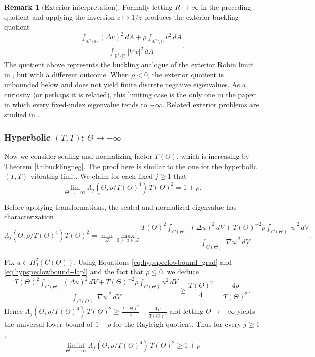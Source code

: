 \documentclass[11pt]{amsart}
\theoremstyle{definition}
\newtheorem{remark}[theorem]{Remark}
\numberwithin{equation}{section}
\newcommand{\lapl}{\Delta}
\newcommand{\grad}{\nabla}
\newcommand{\R}{\mathbb{R}}
\newcommand{\D}{\mathbb{D}}
\begin{document}
\begin{remark}[Exterior interpretation]\label{rem:exterior-buckling}
Formally letting $R\to\infty$ in the preceding quotient and applying the inversion $z\mapsto1/z$ produces the exterior buckling quotient
\[
\dfrac{\displaystyle \int_{\R^2\setminus\D}(\lapl v)^2\,dA
+\rho\int_{\R^2\setminus\D}v^2\,dA}
{\displaystyle \int_{\R^2\setminus\D}|\grad v|^2\,dA}.
\]
The quotient above represents the buckling analogue of the exterior Robin limit in \cite{H25}, but with a different outcome. When $\rho<0$, the exterior quotient is unbounded below and does not yield finite discrete negative eigenvalues. As a curiosity (or perhaps it is related), this limiting case is the only one in the paper in which every fixed-index eigenvalue tends to $-\infty$. Related exterior problems are studied in \cite{AF04,AF05,MM21,MM23}.
\end{remark}

\subsubsection*{Hyperbolic $(T,T)$: $\Theta \to -\infty$} 

Now we consider scaling and normalizing factor $T(\Theta)$, which is increasing by Theorem \ref{th:bucklingneg}. The proof here is similar to the one for the hyperbolic $(T,T)$ vibrating limit. We claim for each fixed $j\ge 1$ that
\[
\lim_{\Theta\to-\infty}\Lambda_j(\Theta,\rho/T(\Theta)^4)\,T(\Theta)^2=1+\rho.
\]

Before applying transformations, the scaled and normalized eigenvalue has characterization
\begin{equation*}
\Lambda_j(\Theta, \rho/T(\Theta)^4)T(\Theta)^2 = \min_{\mathcal{L}}\max_{0 \neq u \in \mathcal{L}}\dfrac{T(\Theta)^2\displaystyle \int_{C(\Theta)} (\lapl u)^2 \, dV +  T(\Theta)^{-2} \rho\int_{C(\Theta)} | u|^2 \, dV} {\displaystyle \int_{C(\Theta)}  |\grad u|^2 \, dV}.
\end{equation*}

\noindent Fix $u\in H_0^2(C(\Theta))$. Using Equations \eqref{eq:hypspeclowbound--grad} and \eqref{eq:hypspeclowbound--lapl} and the fact that $\rho \leq 0$, we deduce
\[
\dfrac{T(\Theta)^2\displaystyle \int_{C(\Theta)} (\lapl u)^2 \, dV +  T(\Theta)^{-2} \rho\int_{C(\Theta)} u^2 \, dV} {\displaystyle \int_{C(\Theta)}  |\grad u|^2 \, dV}
\ge \frac{T(\Theta)^2}{4}+\frac{4\rho}{T(\Theta)^2}.
\]
Hence $\Lambda_j(\Theta,\rho/T(\Theta)^4)\,T(\Theta)^2 \ge \frac{T(\Theta)^2}{4}+\frac{4\rho}{T(\Theta)^2}$ and letting $\Theta\to-\infty$ yields the universal lower bound of $1 + \rho$ for the Rayleigh quotient. Thus for every $j \geq 1$,
\[
\liminf _{\Theta\to-\infty}\Lambda_j(\Theta,\rho/T(\Theta)^4)\,T(\Theta)^2 \geq 1 + \rho
\]
\end{document}
